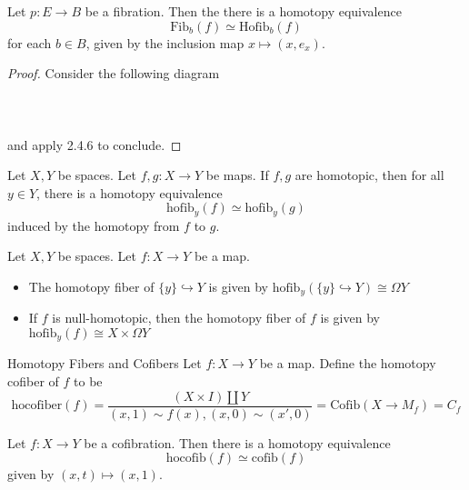 \documentclass[a4paper]{article}
\begin{document}
\begin{prp}{}{} Let $p:E\to B$ be a fibration. Then the there is a homotopy equivalence $$\text{Fib}_b(f)\simeq\text{Hofib}_b(f)$$ for each $b\in B$, given by the inclusion map $x\mapsto(x,e_x)$. \tcbline
\begin{proof}
Consider the following diagram \\~\\
 \\~\\
and apply 2.4.6 to conclude. 
\end{proof}
\end{prp}

\begin{prp}{}{} Let $X,Y$ be spaces. Let $f,g:X\to Y$ be maps. If $f,g$ are homotopic, then for all $y\in Y$, there is a homotopy equivalence $$\text{hofib}_y(f)\simeq\text{hofib}_y(g)$$ induced by the homotopy from $f$ to $g$. 
\end{prp}

\begin{eg}{}{} Let $X,Y$ be spaces. Let $f:X\to Y$ be a map. 
\begin{itemize}
\item The homotopy fiber of $\{y\}\hookrightarrow Y$ is given by $\text{hofib}_y(\{y\}\hookrightarrow Y)\cong\Omega Y$
\item If $f$ is null-homotopic, then the homotopy fiber of $f$ is given by $\text{hofib}_y(f)\cong X\times\Omega Y$
\end{itemize}
\end{eg}

\begin{defn}{Homotopy Fibers and Cofibers}{} Let $f:X\to Y$ be a map. Define the homotopy cofiber of $f$ to be $$\text{hocofiber}(f)=\frac{(X\times I)\amalg Y}{(x,1)\sim f(x),(x,0)\sim(x',0)}=\text{Cofib}(X\to M_f)=C_f$$
\end{defn}

\begin{prp}{}{} Let $f:X\to Y$ be a cofibration. Then there is a homotopy equivalence $$\text{hocofib}(f)\simeq\text{cofib}(f)$$ given by $(x,t)\mapsto(x,1)$. 
\end{prp}
\end{document}
